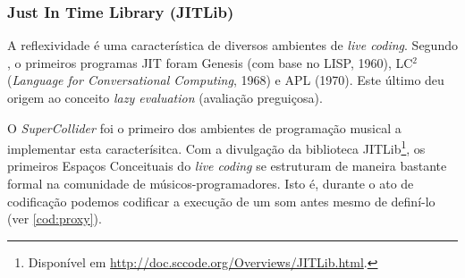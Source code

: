 


\subsubsection{Just In Time Library (JITLib)}\label{sec:jit}

A reflexividade é uma característica de diversos ambientes de \emph{live coding}. Segundo , o primeiros programas JIT foram Genesis (com base no LISP, 1960), LC$^2$ (\emph{Language for Conversational Computing}, 1968) e APL (1970). Este último deu origem ao conceito \emph{lazy evaluation} (avaliação preguiçosa). 

O \emph{SuperCollider} foi o primeiro dos ambientes de programação musical a implementar esta caracterísitca. Com a divulgação da biblioteca JITLib\footnote{Disponível em \url{http://doc.sccode.org/Overviews/JITLib.html}.}, os primeiros Espaços Conceituais do \emph{live coding} se estruturam de maneira bastante formal na comunidade de músicos-programadores. Isto é, durante o ato de codificação podemos codificar a execução de um som antes mesmo de definí-lo (ver \autoref{cod:proxy}).

